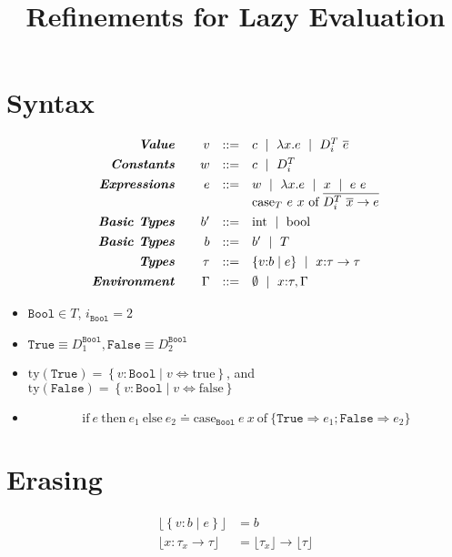 \documentclass[10pt,a4paper]{article}
\title{Refinements for Lazy Evaluation}
\newcommand\dcti{\dct{i}}
\newcommand\dct[1]{\ensuremath{D^T_{#1}}}
\newcommand\efun[2]{\ensuremath{\lambda #1 . #2}}
\newcommand\eapp[2]{\ensuremath{#1 \ #2}}
\newcommand\edata[2]{\ensuremath{#1 \ #2}}
\newcommand\ecase[5]{\ensuremath{\text{case}_T\ #1\ #2\ \text{of}\ \overline{\edata{#3}{#4} \rightarrow #5}}}
\newcommand\etrue{\ensuremath{\text{true}}}
\newcommand\efalse{\ensuremath{\text{false}}}
\newcommand\tint{\ensuremath{\text{int}}}
\newcommand\tbool{\ensuremath{\text{bool}}}
\newcommand\tref[3]{\ensuremath{\left\lbrace {#1} \colon {#2} \mid {#3} \right\rbrace}}
\newcommand\tconref[4]{\tref{#3}{\tcon{#1}{#2}}{#4}}
\newcommand\tcon[2]{\ensuremath{#1\ #2}}
\newcommand\tfun[3]{\ensuremath{#1\colon #2 \rightarrow #3}}
\newcommand\tfunref[5]{\tfun{#1}{#2}{#3}}
\newcommand\ty[1]{\ensuremath{\text{ty}({#1})}}
\newcommand\erase[1]{\ensuremath{\lfloor #1 \rfloor}}
\begin{document}
\section*{Syntax}
$$
\begin{array}{rrcl}
\emphbf{Value} \quad 
  & v
  & ::= 
  &   	 c 
  \spmid \efun{x}{e} 
  \spmid \edata{\dcti}{\overline{e}}
  \\[0.05in] 

\emphbf{Constants} \quad 
  & w
  & ::= 
  &   	 c 
  \spmid \dcti 
  \\[0.05in] 

\emphbf{Expressions} \quad 
  & e
  & ::= 
  &   	 w
  \spmid \efun{x}{e} 
  \spmid x 
  \spmid \eapp{e}{e}  
  \\ &&& \ecase{e}{x}{\dcti}{\overline{x}}{e}
  \\[0.05in] 

\emphbf{Basic Types} \quad 
  & b'
  & ::=  
  & 	\tint \spmid \tbool 
  \\[0.05in] 

\emphbf{Basic Types} \quad 
  & b
  & ::=  
  & 	b' \spmid T
  \\[0.05in] 

\emphbf{Types} \quad 
  & \tau
  & ::=  
  & 	\tref{v}{b}{e}
  \spmid \tfunref{x}{\tau}{\tau}{v}{e}    
  \\[0.05in] 

\emphbf{Environment} \quad 
  & \Gamma
  & ::= 
  &     \emptyset \spmid x\colon \tau, \Gamma

\end{array}
$$

\begin{itemize}
\item $\texttt{Bool}\in T$, $i_\texttt{Bool} = 2$
\item $\texttt{True}  \equiv D^{\texttt{Bool}}_1, \texttt{False} \equiv D^{\texttt{Bool}}_2$
\item $\ty{\texttt{True}} = \tref{v}{\texttt{Bool}}{v \Leftrightarrow \etrue}$, and
$\ty{\texttt{False}} = \tref{v}{\texttt{Bool}}{v \Leftrightarrow \efalse}$
\item
$$\text{if}\ e\ \text{then}\ e_1\ \text{else}\ e_2 \doteq 
\text{case}_{\texttt{Bool}}\ e\ x\ \text{of}\ \{\texttt{True}\Rightarrow e_1;\texttt{False}\Rightarrow e_2 \}
$$
\end{itemize}
\section*{Erasing}
\begin{align*}
\erase{\tref{v}{b}{e}}&=b\\
\erase{\tfunref{x}{\tau_x}{\tau}{v}{e}}&= \erase{\tau_x} \rightarrow \erase{\tau}\\
\end{align*}
\end{document}
